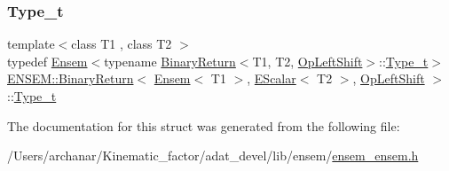 \mbox{\label{structENSEM_1_1BinaryReturn_3_01Ensem_3_01T1_01_4_00_01EScalar_3_01T2_01_4_00_01OpLeftShift_01_4_a5e6b49adaeee5d35d0f6e6065d277e16}} 
\subsubsection{\texorpdfstring{Type\_t}{Type\_t}\hspace{0.1cm}{\footnotesize\ttfamily [2/2]}}
{\footnotesize\ttfamily template$<$class T1 , class T2 $>$ \\
typedef \mbox{\hyperlink{classENSEM_1_1Ensem}{Ensem}}$<$typename \mbox{\hyperlink{structENSEM_1_1BinaryReturn}{Binary\+Return}}$<$T1, T2, \mbox{\hyperlink{structENSEM_1_1OpLeftShift}{Op\+Left\+Shift}}$>$\+::\mbox{\hyperlink{structENSEM_1_1BinaryReturn_3_01Ensem_3_01T1_01_4_00_01EScalar_3_01T2_01_4_00_01OpLeftShift_01_4_a5e6b49adaeee5d35d0f6e6065d277e16}{Type\+\_\+t}}$>$ \mbox{\hyperlink{structENSEM_1_1BinaryReturn}{E\+N\+S\+E\+M\+::\+Binary\+Return}}$<$ \mbox{\hyperlink{classENSEM_1_1Ensem}{Ensem}}$<$ T1 $>$, \mbox{\hyperlink{classENSEM_1_1EScalar}{E\+Scalar}}$<$ T2 $>$, \mbox{\hyperlink{structENSEM_1_1OpLeftShift}{Op\+Left\+Shift}} $>$\+::\mbox{\hyperlink{structENSEM_1_1BinaryReturn_3_01Ensem_3_01T1_01_4_00_01EScalar_3_01T2_01_4_00_01OpLeftShift_01_4_a5e6b49adaeee5d35d0f6e6065d277e16}{Type\+\_\+t}}}



The documentation for this struct was generated from the following file\+:\begin{DoxyCompactItemize}
\item 
/\+Users/archanar/\+Kinematic\+\_\+factor/adat\+\_\+devel/lib/ensem/\mbox{\hyperlink{lib_2ensem_2ensem__ensem_8h}{ensem\+\_\+ensem.\+h}}\end{DoxyCompactItemize}
